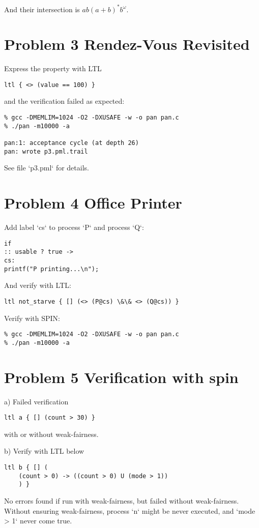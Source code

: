 \documentclass{ctexart}
\begin{document}
And their intersection is $ab(a+b)^*b^\omega$.

\section*{Problem 3 Rendez-Vous Revisited}

Express the property with LTL
\begin{lstlisting}[frame=single]
ltl { <> (value == 100) }
\end{lstlisting}

and the verification failed as expected:
\begin{lstlisting}[frame=single]
% spin -a $<
% gcc -DMEMLIM=1024 -O2 -DXUSAFE -w -o pan pan.c
% ./pan -m10000 -a

pan:1: acceptance cycle (at depth 26)
pan: wrote p3.pml.trail
\end{lstlisting}

See file `p3.pml` for details.

\section*{Problem 4 Office Printer}

Add label `cs` to process `P` and process `Q`:
\begin{lstlisting}[frame=single]
if
:: usable ? true ->
cs:
printf("P printing...\n");
\end{lstlisting}

And verify with LTL:
\begin{lstlisting}[frame=single]
ltl not_starve { [] (<> (P@cs) \&\& <> (Q@cs)) }
\end{lstlisting}

Verify with SPIN:
\begin{lstlisting}[frame=single]
% spin -a $<
% gcc -DMEMLIM=1024 -O2 -DXUSAFE -w -o pan pan.c
% ./pan -m10000 -a
\end{lstlisting}

\section*{Problem 5 Verification with spin}

a) Failed verification
\begin{lstlisting}[frame=single]
ltl a { [] (count > 30) }
\end{lstlisting}
with or without weak-fairness.

b) Verify with LTL below
\begin{lstlisting}[frame=single]
ltl b { [] (
	(count > 0) -> ((count > 0) U (mode > 1))
	) }
\end{lstlisting}
No errors found if run with weak-fairness, but failed without weak-fairness. Without ensuring weak-fairness, process `n` might be never executed, and `mode > 1` never come true.
\end{document}
